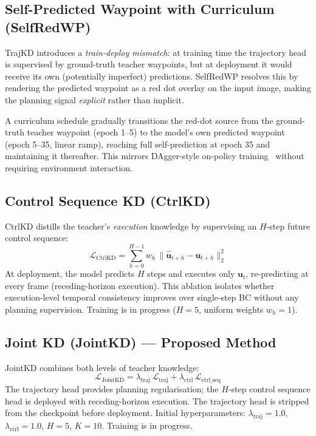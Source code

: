 \documentclass[12pt,a4paper]{article}
\begin{document}
\subsection{Self-Predicted Waypoint with Curriculum (SelfRedWP)}
TrajKD introduces a \emph{train-deploy mismatch}: at training time the trajectory
head is supervised by ground-truth teacher waypoints, but at deployment it would
receive its own (potentially imperfect) predictions.
SelfRedWP resolves this by rendering the predicted waypoint as a red dot overlay
on the input image, making the planning signal \emph{explicit} rather than implicit.

A curriculum schedule gradually transitions the red-dot source from the ground-truth
teacher waypoint (epoch 1--5) to the model's own predicted waypoint (epoch 5--35,
linear ramp), reaching full self-prediction at epoch 35 and maintaining it thereafter.
This mirrors DAgger-style on-policy training~\cite{Ross2011} without requiring
environment interaction.

\subsection{Control Sequence KD (CtrlKD)}
CtrlKD distills the teacher's \emph{execution} knowledge by supervising an
$H$-step future control sequence:
\begin{equation}
  \mathcal{L}_{\text{CtrlKD}}
  = \sum_{h=0}^{H-1} w_h\,\|\hat{\mathbf{u}}_{t+h} - \mathbf{u}_{t+h}\|^2_2
\end{equation}
At deployment, the model predicts $H$ steps and executes only $\mathbf{u}_t$,
re-predicting at every frame (receding-horizon execution).
This ablation isolates whether execution-level temporal consistency
improves over single-step BC without any planning supervision.
Training is in progress ($H{=}5$, uniform weights $w_h{=}1$).

\subsection{Joint KD (JointKD) — Proposed Method}
JointKD combines both levels of teacher knowledge:
\begin{equation}
  \mathcal{L}_{\text{JointKD}}
  = \lambda_{\text{traj}}\,\mathcal{L}_{\text{traj}}
  + \lambda_{\text{ctrl}}\,\mathcal{L}_{\text{ctrl\_seq}}
\end{equation}
The trajectory head provides planning regularisation; the $H$-step control
sequence head is deployed with receding-horizon execution.
The trajectory head is stripped from the checkpoint before deployment.
Initial hyperparameters: $\lambda_{\text{traj}}{=}1.0$,
$\lambda_{\text{ctrl}}{=}1.0$, $H{=}5$, $K{=}10$.
Training is in progress.
\end{document}

